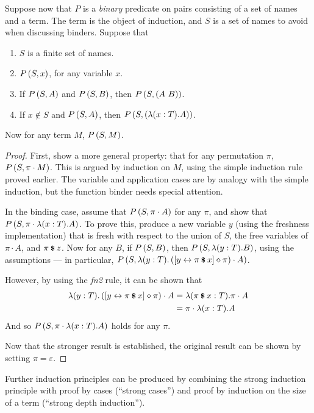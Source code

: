\begin{lemma}
Suppose now that \(P\) is a \emph{binary} predicate on pairs consisting of a set of names and a term.
The term is the object of induction, and \(S\) is a set of names to avoid when discussing binders.
Suppose that
\begin{enumerate}
\item
\(S\) is a finite set of names.
\item
\(P\left(S, x\right)\), for any variable \(x\).
\item
If \(P\left(S, A\right)\) and \(P\left(S, B\right)\), then \(P\left(S, \left(A\ B\right)\right)\).
\item
If \(x \notin S\) and \(P\left(S, A\right)\), then \(P\left(S, \left(\lambda (x:T). A\right)\right)\).
\end{enumerate}
Now for any term \(M\), \(P\left(S, M\right)\).
\end{lemma}
\begin{proof}
First, show a more general property: that for any permutation \(\pi\), \(P\left(S, \pi \cdot M\right)\).
This is argued by induction on \(M\), using the simple induction rule proved earlier.
The variable and application cases are by analogy with the simple induction, but the function binder needs special attention.

In the binding case, assume that \(P\left(S, \pi \cdot A\right)\) for any \(\pi\), and show that \(P\left(S, \pi \cdot \lambda (x:T).A\right)\).
To prove this, produce a new variable \(y\) (using the freshness implementation) that is fresh with respect to the union of \(S\), the free variables of \(\pi \cdot A\), and \(\pi \mathbin{\textrm{\footnotesize{\textbf{\$}}}} z\).
Now for any \(B\), if \(P\left(S, B\right)\), then \(P\left(S, \lambda (y:T).B\right)\), using the assumptions --- in particular, \(P\left(S, \lambda (y:T). \left([y \leftrightarrow \pi \mathbin{\textrm{\footnotesize{\textbf{\$}}}} x] \diamond \pi\right) \cdot A\right)\).

However, by using the \emph{fn2} rule, it can be shown that
\begin{align*}
\lambda (y:T). \left([y \leftrightarrow \pi \mathbin{\textrm{\footnotesize{\textbf{\$}}}} x] \diamond \pi\right) \cdot A
&= \lambda (\pi \mathbin{\textrm{\footnotesize{\textbf{\$}}}} x:T). \pi \cdot A\\
&= \pi \cdot \lambda (x:T). A
\end{align*}
And so \(P\left(S, \pi \cdot \lambda (x:T).A\right)\) holds for any \(\pi\).

Now that the stronger result is established, the original result can be shown by setting \(\pi = \varepsilon\).
\end{proof}

Further induction principles can be produced by combining the strong induction principle with proof by cases (``strong cases'') and proof by induction on the size of a term (``strong depth induction'').

